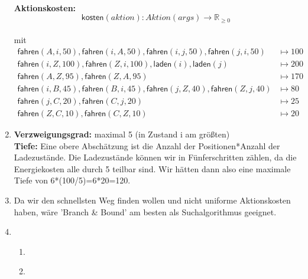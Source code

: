 \documentclass[a4paper,10pt]{article}
\begin{document}
\begin{enumerate}[~~a)]
\begin{enumerate}[~~1.]
\begin{align*}
    \end{align*}
    \end{enumerate}
    \textbf{Aktionskosten:} \\
    $$\textsf{kosten}(aktion): Aktion(args) \rightarrow \mathbb R_{\ge 0}$$\\   mit
    \begin{align*}
    \textsf{fahren}(A,i,50), \textsf{fahren}(i,A,50), \textsf{fahren}(i,j,50), \textsf{fahren}(j,i,50) &\mapsto 100\\
    \textsf{fahren}(i,Z,100), \textsf{fahren}(Z,i,100),\textsf{laden}(i), \textsf{laden}(j) &\mapsto 200\\
    \textsf{fahren}(A,Z,95), \textsf{fahren}(Z,A,95) &\mapsto 170\\
    \textsf{fahren}(i,B,45), \textsf{fahren}(B,i,45), \textsf{fahren}(j,Z,40), \textsf{fahren}(Z,j,40) &\mapsto 80\\
    \textsf{fahren}(j,C,20), \textsf{fahren}(C,j,20) &\mapsto 25\\
    \textsf{fahren}(Z,C,10), \textsf{fahren}(C,Z,10) &\mapsto 20
    \end{align*}

    \item \textbf{Verzweigungsgrad:} maximal 5 (in Zustand i am größten) \\
    \textbf{Tiefe:} Eine obere Abschätzung ist die Anzahl der Positionen*Anzahl der Ladezustände. Die Ladezustände können wir in Fünferschritten zählen, da die Energiekosten alle durch 5 teilbar sind. Wir hätten dann also eine maximale Tiefe von 6*(100/5)=6*20=120.
    \item
    Da wir den schnellsten Weg finden wollen und nicht uniforme Aktionskosten haben, wäre 'Branch \& Bound' am besten als Suchalgorithmus geeignet.
    \item ~\\
    \begin{enumerate}[1.]
        \item ~\\
        \begin{center}
        \end{center}
        \item ~\\
        \begin{center}
\end{center}
\end{enumerate}
\end{enumerate}
\end{document}
